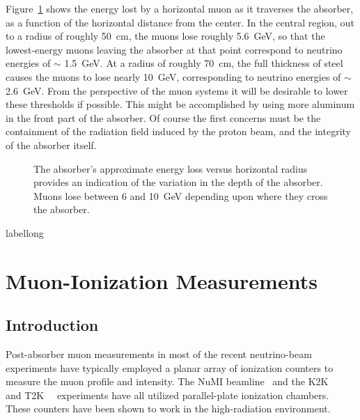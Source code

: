Figure~\ref{fig:AbsorberDepthVsRadius} shows the energy lost by a
horizontal muon as it traverses the absorber, as a function of the
horizontal distance from the center. In the central region, out to a
radius of roughly 50~cm, the muons lose roughly 5.6~GeV, so that the
lowest-energy muons leaving the absorber at that point correspond to
neutrino energies of $\sim$ 1.5~GeV. At a radius of roughly 70~cm, the
full thickness of steel causes the muons to lose nearly 10~GeV,
corresponding to neutrino energies of $\sim$ 2.6~GeV. From the
perspective of the muon systems it will be desirable to lower these
thresholds if possible. This might be accomplished by using more
aluminum in the front part of the absorber. Of course the first
concerns must be the containment of the radiation field induced by the
proton beam, and the integrity of the absorber itself. 

\begin{figure}[htbp]
\begin{center}
\centering
\caption[Energy loss in absorber]{The absorber's approximate
energy loss versus horizontal radius provides an indication of the variation in 
the depth of the absorber. Muons lose between 6 and 10~GeV depending upon where they cross the absorber. }
\label{fig:AbsorberDepthVsRadius}
\end{center}
\end{figure}
\begin{cdrfigure}[short]{label}{long}
\end{cdrfigure}

\section{Muon-Ionization Measurements}

\subsection{Introduction}

Post-absorber muon measurements in most of the recent neutrino-beam
experiments have typically employed a planar array of ionization
counters to measure the muon profile and intensity. The 
NuMI beamline~\cite{ref:NuMIBeamMonitors} and the K2K~\cite{ref:K2K}~\cite{ref:Maruyama}
and T2K~\cite{ref:T2KMuIon}~\cite{ref:T2KMuMon} experiments have all
utilized parallel-plate ionization chambers. These counters have been
shown to work in the high-radiation environment. 

